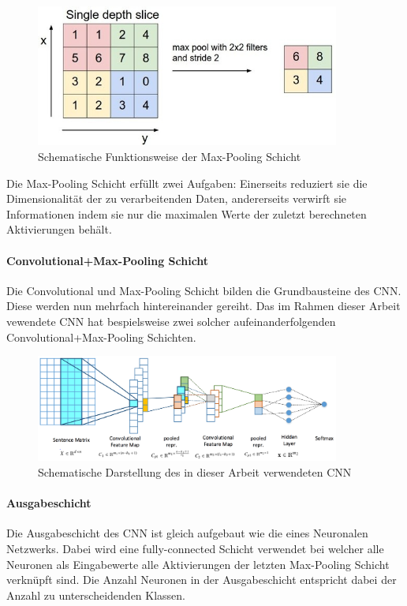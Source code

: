 \begin{figure}[H]
	\centering
	\includegraphics[width=10cm]{img/max_pooling}
	\caption{Schematische Funktionsweise der Max-Pooling Schicht}
\end{figure}

Die Max-Pooling Schicht erfüllt zwei Aufgaben: Einerseits reduziert sie die Dimensionalität der zu verarbeitenden Daten, andererseits verwirft sie  Informationen indem sie nur die maximalen Werte der zuletzt berechneten Aktivierungen behält.

\paragraph{Convolutional+Max-Pooling Schicht} Die Convolutional und Max-Pooling Schicht bilden die Grundbausteine des CNN. Diese werden nun mehrfach hintereinander gereiht. Das im Rahmen dieser Arbeit vewendete CNN hat bespielsweise zwei solcher aufeinanderfolgenden Convolutional+Max-Pooling Schichten.

\begin{figure}[h]
	\centering
	\includegraphics[width=10cm]{img/semeval_cnn_structure}
	\caption{Schematische Darstellung des in dieser Arbeit verwendeten CNN \protect\cite{Deriu:2016}}
\end{figure}

\paragraph{Ausgabeschicht}\label{basic:cnn:output_layer} Die Ausgabeschicht des CNN ist gleich aufgebaut wie die eines  Neuronalen Netzwerks. Dabei wird eine fully-connected Schicht verwendet bei welcher alle Neuronen als Eingabewerte alle Aktivierungen der letzten Max-Pooling Schicht verknüpft sind. Die Anzahl Neuronen in der Ausgabeschicht entspricht dabei der Anzahl zu unterscheidenden Klassen.

